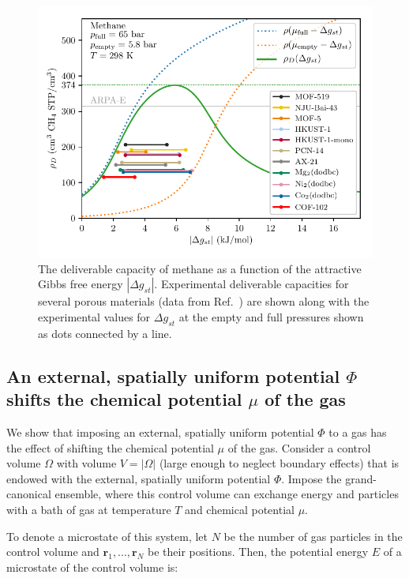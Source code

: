\documentclass[pre,twocolumn]{revtex4-2}
\newcommand\V{\Phi}
\newcommand\gst{\ensuremath{\Delta g_{st}}}
\begin{document}
\begin{figure}
    \centering
    \includegraphics[width=0.95\columnwidth]{methane-298-n-vs-G}
    \caption{The deliverable capacity of methane as a function of the attractive Gibbs free energy $|\gst|$.
    Experimental deliverable capacities for several porous materials (data from Ref.~\cite{mason2014evaluating, furukawa2009storage, tian2018sol, gandara2014high, zhang2017fine}) are shown along with the experimental values for $\gst$ at the empty and full pressures shown as dots connected by a line.}
    \label{fig:methane-298-D}
\end{figure}

\subsection{An external, spatially uniform potential $\V$ shifts the chemical potential $\mu$ of the gas} \label{sec:V_shifts_chem_pot}
We show that imposing an external, spatially uniform potential $\V$ to a gas
has the effect of shifting the chemical potential $\mu$ of the gas. Consider a control volume $\Omega$ with volume
$V=|\Omega|$ (large enough to neglect boundary effects) that is endowed with
the external, spatially uniform potential $\V$. Impose the grand-canonical
ensemble, where this control volume can exchange energy and particles with a
bath of gas at temperature $T$ and chemical potential $\mu$.

To denote a microstate of this system, let $N$ be the number of gas particles
in the control volume and $\mathbf{r}_1,...,\mathbf{r}_N$ be their positions.
Then, the potential energy $E$ of a microstate of the control volume is:
\end{document}
